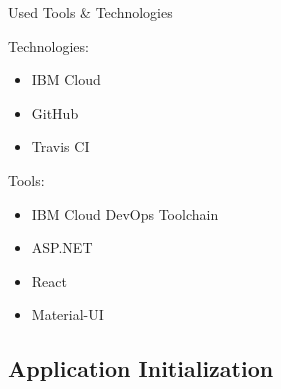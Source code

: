 \documentclass[]{beamer}
\begin{document}
    \begin{frame}{Used Tools \& Technologies}
      \setlength{\columnsep}{-40mm}
      \begin{adjustwidth}{12.5mm}{-12.5mm}
        \begin{multicols}{2}
          Technologies:
          \begin{itemize}
            \item IBM Cloud
            \item GitHub
            \item Travis CI
          \end{itemize}

          \columnbreak

          Tools:
          \begin{itemize}
            \item IBM Cloud DevOps Toolchain
            \item ASP.NET
            \item React
            \item Material-UI
          \end{itemize}
        \end{multicols}
      \end{adjustwidth}
    \end{frame}

  \subsection{Application Initialization}
\end{document}
